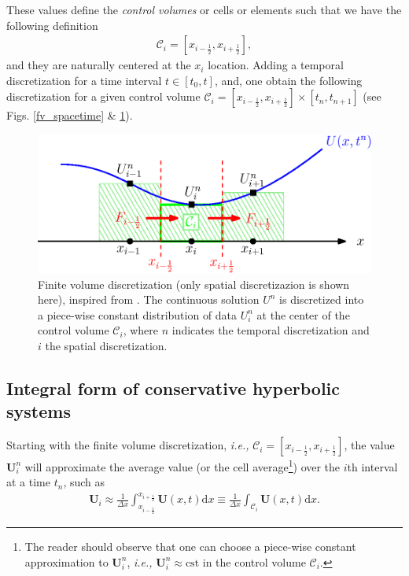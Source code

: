 \documentclass[a4paper]{article}
\numberwithin{equation}{section}
\newcommand{\ie}{\textit{i.e.,} }
\begin{document}
	These values define the \textit{control volumes} or cells or elements such that we have the following definition
	\begin{align}
		\mathcal{C}_i = [x_{i-\frac{1}{2}},x_{i+\frac{1}{2}}],
	\end{align} 
	and they are naturally centered at the $x_i$ location. Adding a temporal discretization for a time interval $t\in[t_0,t]$, and, one obtain the following discretization for a given control volume $\mathcal{C}_i=[x_{i-\frac{1}{2}},x_{i+\frac{1}{2}}]\times[t_{n},t_{n+1}]$ (see Figs. \ref{fv_spacetime} \& \ref{fv_discretization}).
	\begin{figure}[htbp]
		\centering
		\includegraphics[scale=0.75]{imgs/fvmdiscr.eps}
		\caption{Finite volume discretization (only spatial discretizazion is shown here), inspired from \cite{Lagree2022}. The continuous solution $U^n$ is discretized into a piece-wise constant distribution \parencite{godunov1959} of data $U_i^n$ at the center of the control volume $\mathcal{C}_i$, where $n$ indicates the temporal discretization and $i$ the spatial discretization.}
		\label{fv_discretization}
	\end{figure}

	
	\subsection{Integral form of conservative hyperbolic systems}
	Starting with the finite volume discretization, \ie $\mathcal{C}_i = [x_{i-\frac{1}{2}},x_{i+\frac{1}{2}}]$, the value $\mathbf{U}_i^n$ will approximate the average value (or the cell average\footnote{The reader should observe that one can choose a piece-wise constant approximation to $\mathbf{U}_i^n$, \ie $\mathbf{U}_i^n \approx \mathrm{cst}$ in the control volume $\mathcal{C}_i$.}) over the $i$th interval at a time $t_n$, such as
	\begin{align}
		\label{cell_average}
		\mathbf{U}_i \approx \frac{1}{\Delta x} \int_{x_{i-\frac{1}{2}}}^{x_{i+\frac{1}{2}}} \mathbf{U}(x,t) \mathrm{d}x \equiv \frac{1}{\Delta x} \int_{\mathcal{C}_i} \mathbf{U}(x,t) \mathrm{d}x.
	\end{align}
\end{document}
